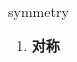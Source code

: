
\begin{frame}
{\huge symmetry}
\begin{center}
\begin{enumerate}\Large
  \item \textbf{对称}
\end{enumerate}
\end{center}
\end{frame}
